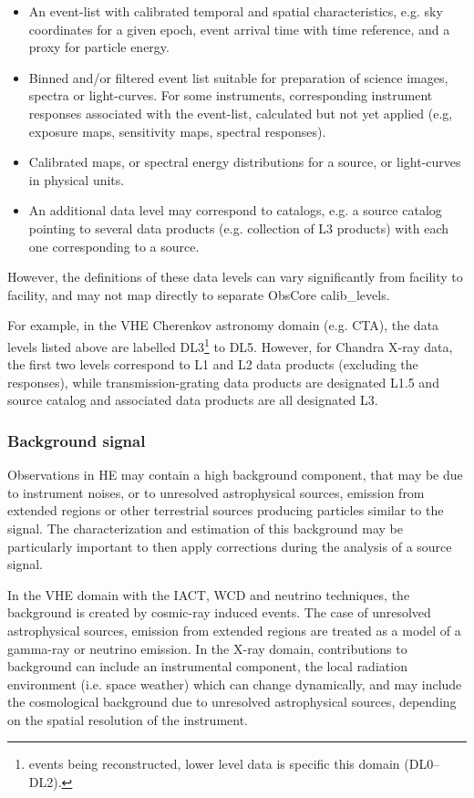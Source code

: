 \documentclass[11pt,a4paper]{ivoa}
\begin{document}
\begin{itemize}
    \item[1] An event-list with calibrated temporal and spatial characteristics, e.g. sky coordinates for a given epoch, event arrival time with time reference, and a proxy for particle energy.
    \item[2] Binned and/or filtered event list suitable for preparation of science images, spectra or light-curves.  For some instruments, corresponding instrument responses associated with the event-list, calculated but not yet applied (e.g, exposure maps, sensitivity maps, spectral responses).
    \item[3] Calibrated maps, or spectral energy distributions for a source, or light-curves in physical units.
    \item[4] An additional data level may correspond to catalogs, e.g. a source catalog pointing to several data products (e.g. collection of L3 products) with each one corresponding to a source. 
\end{itemize}

However, the definitions of these data levels can vary significantly from facility to facility, and may not map directly to separate ObsCore calib\_levels.  

For example, in the VHE Cherenkov astronomy domain (e.g. CTA), the data levels listed above are labelled DL3\footnote{events being reconstructed, lower level data is specific this domain (DL0--DL2).} to DL5.  However, for Chandra X-ray data, the first two levels correspond  to L1 and L2 data products (excluding the responses), while transmission-grating data products are designated L1.5 and source catalog and associated data products are all designated L3.


\subsubsection{Background signal}

Observations in HE may contain a high background component, that may be due to instrument noises, or to unresolved astrophysical sources, emission from extended regions or other terrestrial sources producing particles similar to the signal. The characterization and estimation of this background may be particularly important to then apply corrections during the analysis of a source signal.

In the VHE domain with the IACT, WCD and neutrino techniques, the background is created by cosmic-ray induced events. The case of unresolved astrophysical sources, emission from extended regions are treated as a model of a gamma-ray or neutrino emission.  In the X-ray domain, contributions to background can include an instrumental component, the local radiation environment (i.e. space weather) which can change dynamically, and may include the cosmological background due to unresolved astrophysical sources, depending on the spatial resolution of the instrument.
\end{document}
